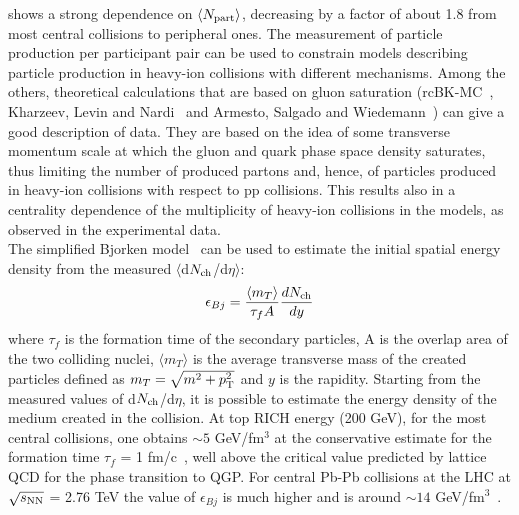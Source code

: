shows a strong dependence on $\langle N_{\rm part}\rangle$, decreasing 
by a factor of about 1.8 from most central collisions to peripheral ones. The 
measurement of particle production per participant pair can be used to 
constrain models describing particle production in heavy-ion collisions 
with different mechanisms. Among the others, theoretical calculations that
 are based on gluon saturation 
 (rcBK-MC~\cite{Albacete:2011fw}, Kharzeev, Levin and Nardi~\cite{Kharzeev:2004if} 
 and Armesto, Salgado and Wiedemann~\cite{Armesto:2004ud}) can 
 give a good description of data. They are based on the idea of some 
 transverse momentum scale at which the gluon and quark phase space 
 density saturates, thus limiting the number of produced partons and, 
 hence, of particles produced in heavy-ion collisions with respect to pp collisions.  
 This results also in a centrality dependence of the multiplicity of 
 heavy-ion collisions in the models, as observed in the experimental
data. \\
The simplified Bjorken model~\cite{Bjorken:1982qr} can be used to 
estimate the initial spatial energy density from the measured 
$\langle$d$N_{\rm ch}$/d$\eta$$\rangle$:
\begin{equation}
\label{Bjorken}
\epsilon_{Bj} = \frac{\langle m_T\rangle}{\tau_f A}\frac{dN_{\rm ch}}{dy}
\end{equation}
where $\tau_f$ is the formation time of the secondary particles, A is the overlap 
area of the two colliding nuclei, $\langle m_T \rangle$ is the average transverse 
mass of the created particles defined as $m_{T} = \sqrt{m^{2}+p_{\rm T}^2}$ and $y$ 
is the rapidity. Starting from the measured values of d$N_{\rm ch}$/d$\eta$, it is 
possible to estimate the energy density of the medium created in the collision.
At top RICH energy (200 GeV), for the most central collisions, one obtains 
$\sim 5$ GeV/fm$^3$ at the conservative estimate for the formation time 
$\tau_f$ = 1 fm/c~\cite{Bjorken:1982qr}, well above the critical value predicted 
by lattice QCD for the phase transition to QGP. For central Pb-Pb collisions at the LHC 
at $\sqrt{s_{\rm NN}}$ = 2.76 TeV the value of $\epsilon_{Bj}$ is much higher and is 
around $\sim 14$ GeV/fm$^3$~\cite{Chatrchyan:2012mb}.

